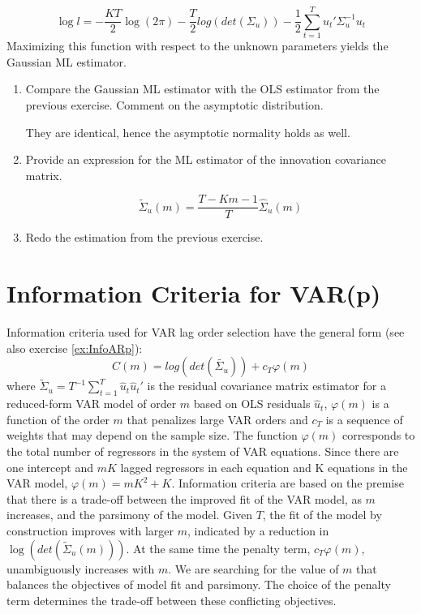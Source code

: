 \documentclass[a4paper]{scrartcl}
\begin{document}
    $$\log l = -\frac{KT}{2}\log(2\pi) - \frac{T}{2}log(det(\Sigma_u))- \frac{1}{2}\sum_{t=1}^Tu_t'\Sigma_u^{-1}u_t$$
    Maximizing this function with respect to the unknown parameters yields the Gaussian ML estimator.
    \begin{enumerate}
        \item Compare the Gaussian ML estimator with the OLS estimator from the previous exercise. Comment on the asymptotic distribution.
              \begin{solution}
                  They are identical, hence the asymptotic normality holds as well.
              \end{solution}
        \item Provide an expression for the ML estimator of the innovation covariance matrix.
              \begin{solution}
                  $$\tilde{\Sigma}_u(m) = \frac{T-Km-1}{T}\hat{\Sigma}_u(m)$$
              \end{solution}
        \item Redo the estimation from the previous exercise.
              \begin{solution}
                  
              \end{solution}
    \end{enumerate}
    
    \newpage
    \section{Information Criteria for VAR(p)}
    Information criteria used for VAR lag order selection have the general form (see also exercise \ref{ex:InfoARp}):
    $$C(m) = log(det(\tilde{\Sigma_u})) + c_T \varphi(m)$$
    where $\tilde{\Sigma}_u=T^{-1}\sum_{t=1}^T \hat{u}_t\hat{u}_t'$ is the residual covariance matrix estimator for a reduced-form VAR model of order $m$ based on OLS residuals $\hat{u}_t$, $\varphi(m)$ is a function of the order $m$ that penalizes large VAR orders and $c_T$ is a sequence of weights that may depend on the sample size.
    The function $\varphi(m)$ corresponds to the total number of regressors in the system of VAR equations. Since there are one intercept and $mK$ lagged regressors in each equation and K equations in the VAR model, $\varphi(m)= mK^2 + K$. Information criteria are based on the premise that there is a trade-off between the improved fit of the VAR model, as $m$ increases, and the parsimony of the model. Given $T$, the fit of the model by construction improves with larger $m$, indicated by a reduction in $\log(det(\tilde{\Sigma}_u(m)))$. At the same time the penalty term, $c_T \varphi(m)$, unambiguously increases with $m$. We are searching for the value of $m$ that balances the objectives of model fit and parsimony. The choice of the penalty term determines the trade-off between these conflicting objectives. 
    
\end{document}
